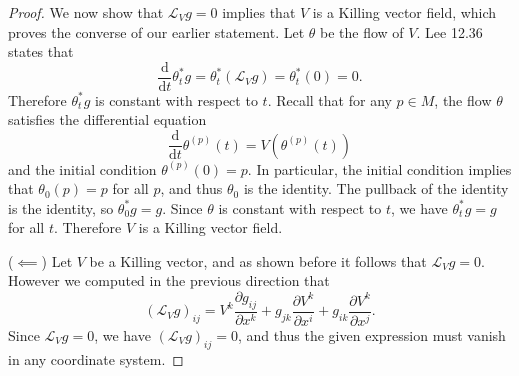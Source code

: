 \documentclass[11pt, letterpaper]{article}
\begin{document}
\begin{proof}
    We now show that $\mathcal{L} _Vg=0$ implies that $V$ is a Killing vector field, which proves the converse of our earlier statement. Let $\theta $ be the flow of $V$. Lee 12.36 states that
    \[
    	\frac{\mathrm{d}}{\mathrm{d}t} \theta ^*_t g=\theta _t^*(\mathcal{L} _Vg)=\theta _t^*(0)=0
    .\]
    Therefore $\theta ^*_t g$ is constant with respect to $t$. Recall that for any $p\in M$, the flow $\theta$ satisfies the differential equation
    \[
    	\frac{\mathrm{d}}{\mathrm{d}t} \theta^{(p)} (t) = V(\theta ^{(p)} (t))
    \]
    and the initial condition $\theta ^{(p)} (0)=p$. In particular, the initial condition implies that $\theta _0(p)=p$ for all $p$, and thus $\theta _0$ is the identity. The pullback of the identity is the identity, so $\theta ^*_0g=g$. Since $\theta $ is constant with respect to $t$, we have $\theta ^*_t g=g$ for all $t$. Therefore $V$ is a Killing vector field.

    ($\impliedby $) Let $V$ be a Killing vector, and as shown before it follows that $\mathcal{L} _Vg=0$. However we computed in the previous direction that
    \[
	    (\mathcal{L} _Vg)_{ij} =V^k \frac{\partial g_{ij} }{\partial x^k} +g_{jk} \frac{\partial V^k}{\partial x^i} +g_{ik} \frac{\partial V^k}{\partial x^j} 
    .\]
    Since $\mathcal{L} _Vg=0$, we have $(\mathcal{L} _Vg)_{ij} =0$, and thus the given expression must vanish in any coordinate system.
    
\end{proof}
\end{document}
